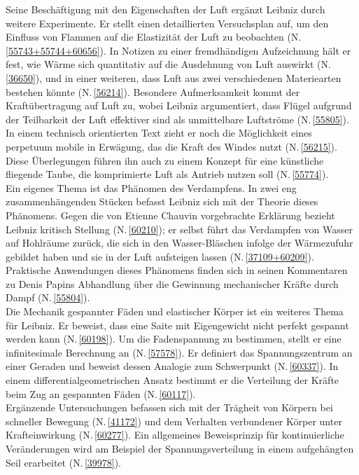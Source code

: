 Seine Beschäftigung mit den Eigenschaften der Luft ergänzt Leibniz durch weitere Experimente. Er stellt einen detaillierten Versuchsplan auf, um den Einfluss von Flammen auf die Elastizität der Luft zu beobachten (N.\,\ref{55743+55744+60656}). In Notizen zu einer fremdhändigen Aufzeichnung hält er fest, wie Wärme sich quantitativ auf die Ausdehnung von Luft auswirkt (N.\,\ref{36650}), und in einer weiteren, dass Luft aus zwei verschiedenen Materiearten bestehen könnte (N.\,\ref{56214}). Besondere Aufmerksamkeit kommt der Kraftübertragung auf Luft zu, wobei Leibniz argumentiert, dass Flügel aufgrund der Teilbarkeit der Luft effektiver sind als unmittelbare Luftströme (N.\,\ref{55805}). In einem technisch orientierten Text zieht er noch die Möglichkeit eines perpetuum mobile in Erwägung, das die Kraft des Windes nutzt (N.\,\ref{56215}). Diese Überlegungen führen ihn auch zu einem Konzept für eine künstliche fliegende Taube, die komprimierte Luft als Antrieb nutzen soll (N.\,\ref{55774}).%
\\ \indent
Ein eigenes Thema ist das Phänomen des Verdampfens. In zwei eng zusammenhängenden Stücken befasst Leibniz sich mit der Theorie dieses Phänomens. Gegen die von Etienne Chauvin vorgebrachte Erklärung bezieht Leibniz kritisch Stellung (N.\,\ref{60210}); er selbst führt das Verdampfen von Wasser auf Hohlräume zurück, die sich in den Wasser-Bläschen infolge der Wärmezufuhr gebildet haben und sie in der Luft aufsteigen lassen (N.\,\ref{37109+60209}). Praktische Anwendungen dieses Phänomens finden sich in seinen Kommentaren zu Denis Papins Abhandlung über die Gewinnung mechanischer Kräfte durch Dampf (N.\,\ref{55804}).%
\\ \indent
Die Mechanik gespannter Fäden und elastischer Körper ist ein weiteres Thema für Leibniz. Er  beweist, dass eine Saite mit Eigengewicht nicht perfekt gespannt werden kann (N.\,\ref{60198}). Um die Fadenspannung zu bestimmen, stellt er eine infinitesimale Berechnung an (N.\,\ref{57578}). Er definiert das Spannungszentrum an einer Geraden und beweist dessen Analogie zum Schwerpunkt (N.\,\ref{60337}). In einem differentialgeometrischen Ansatz bestimmt er die Verteilung der Kräfte beim Zug an gespannten Fäden (N.\,\ref{60117}).%
\\ \indent
Ergänzende Untersuchungen befassen sich mit der Trägheit von Körpern bei schneller Bewegung (N.\,\ref{41172}) und dem Verhalten verbundener Körper unter Krafteinwirkung (N.\,\ref{60277}). Ein allgemeines Beweisprinzip für kontinuierliche Veränderungen wird am Beispiel der Spannungsverteilung in einem aufgehängten Seil erarbeitet (N.\,\ref{39978}).%
